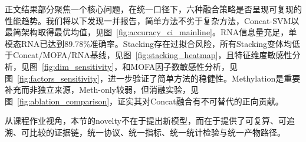 正文结果部分聚焦一个核心问题，在统一口径下，六种融合策略是否呈现可复现的性能趋势。我们将以下发现一并报告，简单方法不劣于复杂方法，Concat-SVM以最简架构取得最优均值，见图~\ref{fig:accuracy_ci_mainline}。RNA信息量充足，单模态RNA已达到89.78\%准确率。Stacking存在过拟合风险，所有Stacking变体均低于Concat/MOFA/RNA基线，见图~\ref{fig:stacking_heatmap}，且特征维度敏感性分析，见图~\ref{fig:dim_sensitivity}，和MOFA因子数敏感性分析，见图~\ref{fig:factors_sensitivity}，进一步验证了简单方法的稳健性。Methylation是重要补充而非独立来源，Meth-only较弱，但消融实验，见图~\ref{fig:ablation_comparison}，证实其对Concat融合有不可替代的正向贡献。

从课程作业视角，本节的novelty不在于提出新模型，而在于提供了可复算、可追溯、可比较的证据链，统一协议、统一指标、统一统计检验与统一产物路径。

